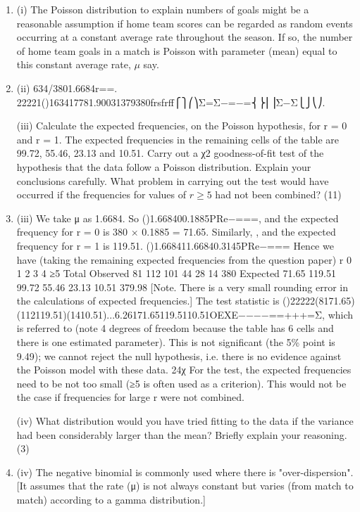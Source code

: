 \documentclass[a4paper,12pt]{article}
\begin{document}
\begin{enumerate}
    \item 
(i) The Poisson distribution to explain numbers of goals might be a reasonable assumption if home team scores can be regarded as random events occurring at a constant average rate throughout the season. If so, the number of home team goals in a match is Poisson with parameter (mean) equal to this constant average rate, $\mu$ say.
    \item  (ii) 634/3801.6684r==.
22221()163417781.90031379380frsfrff⎧⎫⎛⎞Σ=Σ−=−=⎨⎬⎜⎟Σ−Σ⎩⎭⎝⎠.
    

\newpage
\begin{framed}
(iii) Calculate the expected frequencies, on the Poisson hypothesis, for r = 0 and r = 1.  The expected frequencies in the remaining cells of the table are 99.72, 55.46, 23.13 and 10.51.  Carry out a χ2 goodness-of-fit test of the hypothesis that the data follow a Poisson distribution.  Explain your conclusions carefully.  What problem in carrying out the test would have occurred if the frequencies for values of $r \geq 5$ had not been combined? (11)
\end{framed}
    \item  (iii) We take μ as 1.6684. So ()1.668400.1885PRe−===, and the expected frequency for r = 0 is 380 × 0.1885 = 71.65.
Similarly, , and the expected frequency for r = 1 is 119.51. ()1.668411.66840.3145PRe−===
Hence we have (taking the remaining expected frequencies from the question paper)
r
0
1
2
3
4
≥5
Total
Observed
81
112
101
44
28
14
380
Expected
71.65
119.51
99.72
55.46
23.13
10.51
379.98
[Note. There is a very small rounding error in the calculations of expected frequencies.]
The test statistic is
()22222(8171.65)(112119.51)(1410.51)...6.26171.65119.5110.51OEXE−−−−==+++=Σ,
which is referred to (note 4 degrees of freedom because the table has 6 cells and there is one estimated parameter). This is not significant (the 5\% point is 9.49); we cannot reject the null hypothesis, i.e. there is no evidence against the Poisson model with these data. 24χ
For the test, the expected frequencies need to be not too small (≥5 is often used as a criterion). This would not be the case if frequencies for large r were not combined.
\newpage
\begin{framed}
 
 
(iv) What distribution would you have tried fitting to the data if the variance had been considerably larger than the mean?  Briefly explain your reasoning. (3) 
 


\end{framed}
    \item (iv) The negative binomial is commonly used where there is "over-dispersion". [It assumes that the rate (μ) is not always constant but varies (from match to match) according to a gamma distribution.]
\end{enumerate}
\end{document}
